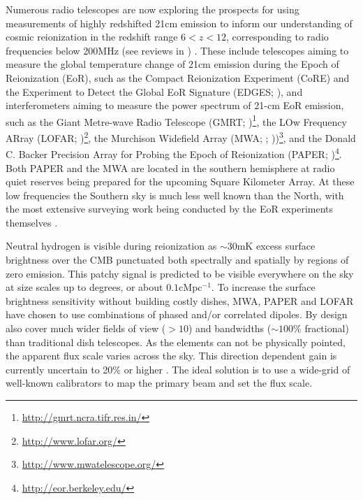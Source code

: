 \documentclass[preprint]{aastex}
\begin{document}
Numerous radio telescopes are now exploring the prospects for
using measurements of highly redshifted 21cm emission to inform our understanding
of cosmic reionization in the redshift range $6< z<12$, corresponding to radio frequencies below 200MHz (see reviews in  \citet{Furlanetto:2006p2267,Morales:2010p8093,Pritchard:2012p9555}) .  
These include telescopes aiming to measure the global temperature change of 
21cm emission during the Epoch of Reionization (EoR), such as
the Compact Reionization Experiment (CoRE) and
the Experiment to Detect the Global EoR Signature (EDGES; \citealt{Bowman:2010p8546}),
and interferometers aiming to measure the power spectrum of 21-cm EoR emission, such as
the Giant Metre-wave Radio Telescope (GMRT;
\citealt{Paciga:2011p9470,Paciga:2013p9627})\footnote{\url{http://gmrt.ncra.tifr.res.in/}},
the LOw Frequency ARray (LOFAR; \citealt{Yatawatta:2013p9699})\footnote{\url{http://www.lofar.org/}},
the Murchison Widefield Array (MWA;  \citealt{Bowman:2012p9138}; \citealt{Tingay:2013p9022}))\footnote{\url{http://www.mwatelescope.org/}}, 
and 
the Donald C. Backer Precision Array for Probing the Epoch of Reionization (PAPER;
\citealt{Parsons:2010p6757})\footnote{\url{http://eor.berkeley.edu/}}. Both PAPER and the MWA are located in the southern hemisphere at radio quiet reserves being prepared for the upcoming Square Kilometer Array.  At these low frequencies the Southern sky is much less well known than the North, with the most extensive surveying work being conducted  by the EoR experiments themselves \citep{Jacobs:2011p8438,Williams:2012p8768}.
  
Neutral hydrogen is visible during reionization as $\sim$30mK excess surface brightness over the CMB punctuated both spectrally and spatially by regions of zero emission.
This patchy signal is predicted to be visible everywhere on the sky at size scales up to degrees, or about $0.1$cMpc$^{-1}$.   To increase the surface brightness sensitivity without building costly dishes, MWA, PAPER and LOFAR have chosen to use combinations of phased and/or correlated dipoles. By design also cover much wider fields of view ($>10$\arcdeg) and bandwidths ($\sim 100$\% fractional) than traditional dish telescopes.   As the elements can not be physically pointed, the apparent flux scale varies across the sky. This direction dependent gain is currently uncertain to 20\% or higher \citep{Jacobs:2013p9713}.  The ideal solution is to use a wide-grid of well-known calibrators to map the primary beam and set the flux scale.  
\end{document}
